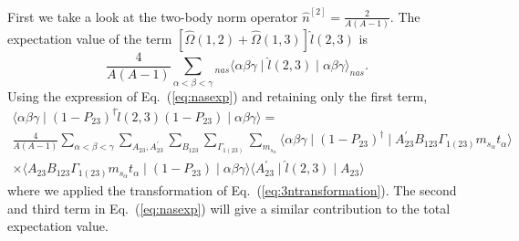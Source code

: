 \documentclass[notitlepage,a4paper,final,amsfonts,amsmath,amssymb]{revtex4-1}
\newcommand{\ket}[1]{\mid #1 \rangle}
\newcommand{\bra}[1]{\langle #1 \mid}
\begin{document}
First we take a look at the two-body norm operator $\hat{n}^{[2]} = \frac{2}{A(A-1)}$.
The expectation value of the term 
$[ \hat{\Omega}(1,2) + \hat{\Omega}(1,3) ] \hat{l}(2,3)$ is
\begin{equation}
  \frac{4}{A(A-1)} \sum_{\alpha<\beta<\gamma} {}_{nas}\bra{\alpha\beta\gamma} \hat{l}(2,3) \ket{\alpha\beta\gamma}_{nas}.
\end{equation}
Using the expression of Eq.~(\ref{eq:nasexp}) and retaining only the first term,
\begin{multline}
  \bra{\alpha\beta\gamma} (1-P_{23})^\dagger \hat{l}(2,3) (1-P_{23}) \ket{\alpha\beta\gamma} = \\
  \frac{4}{A(A-1)} 
  \sum_{\alpha<\beta<\gamma} 
  \sum_{ A_{23}, A_{23}^\prime }
  \sum_{ B_{123} }
  \sum_{ \Gamma_{1(23)} }
  \sum_{m_{s_\alpha}} 
  \bra{\alpha \beta \gamma } 
  (1-P_{23})^\dagger
  \ket{ A^\prime_{23} B_{123} \Gamma_{1(23)} m_{s_\alpha} t_\alpha   }  \\ \times
  \bra{ A_{23} B_{123} \Gamma_{1(23)} m_{s_\alpha} t_\alpha   }
   (1-P_{23}) \ket{\alpha \beta \gamma }  
   \bra{ A^\prime_{23} } \hat{l}(2,3) \ket{A_{23}}
 \end{multline}
where we applied the transformation of Eq.~(\ref{eq:3ntransformation}).
The second and third term in Eq.~(\ref{eq:nasexp}) will give a similar contribution to the total expectation value.
\end{document}
